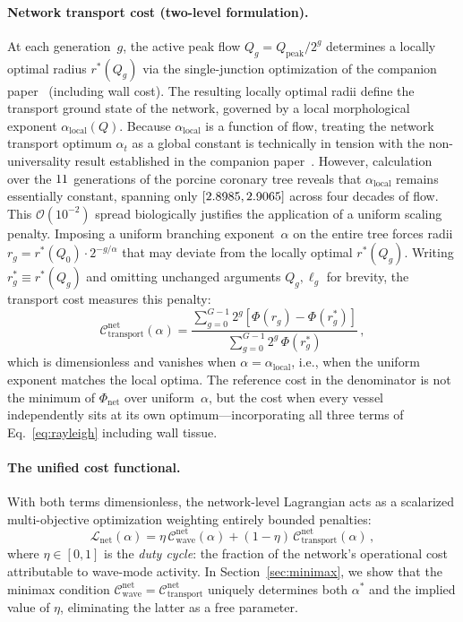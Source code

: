 \documentclass[11pt,a4paper]{article}
\theoremstyle{remark}
\begin{document}
\paragraph{Network transport cost (two-level formulation).}
At each generation~$g$, the active peak flow $Q_g = Q_{\mathrm{peak}}/2^g$
determines a locally optimal radius $r^*(Q_g)$ via the single-junction
optimization of the companion paper~\cite{Marchesi2026static} (including wall
cost). The resulting locally optimal radii define the transport ground state of
the network, governed by a local morphological exponent
$\alpha_\mathrm{local}(Q)$. Because $\alpha_\mathrm{local}$ is a function of
flow, treating the network transport optimum $\alpha_t$ as a global constant is
technically in tension with the non-universality result established in the
companion paper~\cite{Marchesi2026static}.
However, calculation over the $11$ generations of the porcine coronary tree
reveals that $\alpha_\mathrm{local}$ remains essentially constant, spanning only
$[2.8985, 2.9065]$ across four decades of flow. This
$\mathcal{O}(10^{-2})$ spread biologically justifies the application of a
uniform scaling penalty. Imposing a uniform branching exponent~$\alpha$ on the
entire tree forces radii $r_g = r^*(Q_0) \cdot 2^{-g/\alpha}$ that may deviate
from the locally optimal $r^*(Q_g)$. Writing $r^*_g \equiv r^*(Q_g)$ and
omitting unchanged arguments $Q_g, \ell_g$ for brevity, the transport cost
measures this penalty:
\begin{equation}
  \mathcal{C}_\mathrm{transport}^\mathrm{net}(\alpha) =
  \frac{\displaystyle\sum_{g=0}^{G-1} 2^g \left[ \Phi(r_g) - \Phi(r^*_g) \right]}{\displaystyle\sum_{g=0}^{G-1} 2^g\,\Phi(r^*_g)}\,,
  \label{eq:Ctransportnet}
\end{equation}
which is dimensionless and vanishes when $\alpha = \alpha_\mathrm{local}$, i.e.,
when the uniform exponent matches the local optima. The reference cost in the
denominator is not the minimum of $\Phi_\mathrm{net}$ over uniform~$\alpha$, but
the cost when every vessel independently sits at its own optimum---incorporating
all three terms of Eq.~\eqref{eq:rayleigh} including wall tissue.

\paragraph{The unified cost functional.}
With both terms dimensionless, the network-level Lagrangian acts as a scalarized
multi-objective optimization weighting entirely bounded penalties:
\begin{equation}
  \boxed{\mathcal{L}_\mathrm{net}(\alpha) = \eta\,\mathcal{C}_\mathrm{wave}^\mathrm{net}(\alpha) + (1-\eta)\,\mathcal{C}_\mathrm{transport}^\mathrm{net}(\alpha)\,,}
  \label{eq:Lnet}
\end{equation}
where $\eta \in [0,1]$ is the \emph{duty cycle}: the fraction of the network's
operational cost attributable to wave-mode activity. In
Section~\ref{sec:minimax}, we show that the minimax condition
$\mathcal{C}^{\mathrm{net}}_{\mathrm{wave}} =
\mathcal{C}^{\mathrm{net}}_{\mathrm{transport}}$ uniquely determines both
$\alpha^*$ and the implied value of $\eta$, eliminating the latter as a free
parameter.
\end{document}
